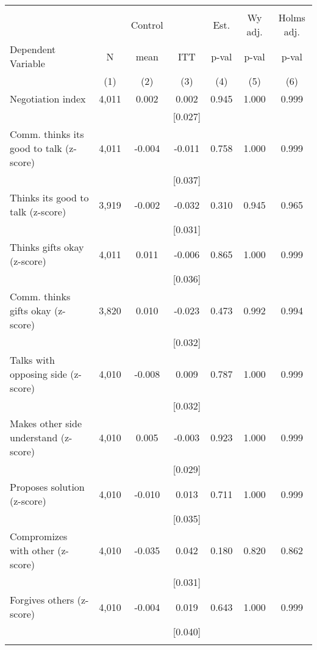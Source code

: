 \begin{tabular}{lcccccc}
\hline \noalign{\smallskip} &  &  &  &  &  & \\
 &  & Control &  & Est. & Wy adj. & Holms adj.\\
Dependent Variable & N & mean & ITT & p-val & p-val & p-val\\
 & (1) & (2) & (3) & (4) & (5) & (6)\\
\noalign{\smallskip}\hline \noalign{\smallskip}Negotiation index & 4,011 & 0.002 & 0.002 & 0.945 & 1.000 & 0.999\\
 &  &  & [0.027] &  &  & \\
\quad Comm. thinks its good to talk (z-score) & 4,011 & -0.004 & -0.011 & 0.758 & 1.000 & 0.999\\
 &  &  & [0.037] &  &  & \\
\quad Thinks its good to talk (z-score) & 3,919 & -0.002 & -0.032 & 0.310 & 0.945 & 0.965\\
 &  &  & [0.031] &  &  & \\
\quad Thinks gifts okay (z-score) & 4,011 & 0.011 & -0.006 & 0.865 & 1.000 & 0.999\\
 &  &  & [0.036] &  &  & \\
\quad Comm. thinks gifts okay (z-score) & 3,820 & 0.010 & -0.023 & 0.473 & 0.992 & 0.994\\
 &  &  & [0.032] &  &  & \\
\quad Talks with opposing side (z-score) & 4,010 & -0.008 & 0.009 & 0.787 & 1.000 & 0.999\\
 &  &  & [0.032] &  &  & \\
\quad Makes other side understand (z-score) & 4,010 & 0.005 & -0.003 & 0.923 & 1.000 & 0.999\\
 &  &  & [0.029] &  &  & \\
\quad Proposes solution (z-score) & 4,010 & -0.010 & 0.013 & 0.711 & 1.000 & 0.999\\
 &  &  & [0.035] &  &  & \\
\quad Compromizes with other (z-score) & 4,010 & -0.035 & 0.042 & 0.180 & 0.820 & 0.862\\
 &  &  & [0.031] &  &  & \\
\quad Forgives others (z-score) & 4,010 & -0.004 & 0.019 & 0.643 & 1.000 & 0.999\\
 &  &  & [0.040] &  &  & \\
\noalign{\smallskip}\hline\end{tabular}
